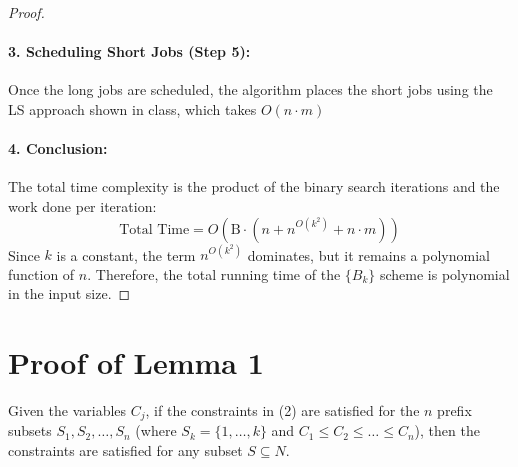 \begin{proof}
\paragraph{3. Scheduling Short Jobs (Step 5):}
Once the long jobs are scheduled, the algorithm places the short jobs  using the LS approach shown in class, which takes $O(n\cdot m)$


\paragraph{4. Conclusion:}
The total time complexity is the product of the binary search iterations and the work done per iteration:
\[ \text{Total Time} = O\left( \text{B} \cdot (n + n^{O(k^2)} + n \cdot m) \right) \]
Since $k$ is a constant, the term $n^{O(k^2)}$ dominates, but it remains a polynomial function of $n$. Therefore, the total running time of the $\{B_k\}$ scheme is polynomial in the input size.
\end{proof}
\newpage



\section*{Proof of Lemma 1}

\begin{lemma}
Given the variables $C_j$, if the constraints in (2) are satisfied for the $n$ prefix subsets $S_1, S_2, \dots, S_n$ (where $S_k = \{1, \dots, k\}$ and $C_1 \le C_2 \le \dots \le C_n$), then the constraints are satisfied for any subset $S \subseteq N$.
\end{lemma}

